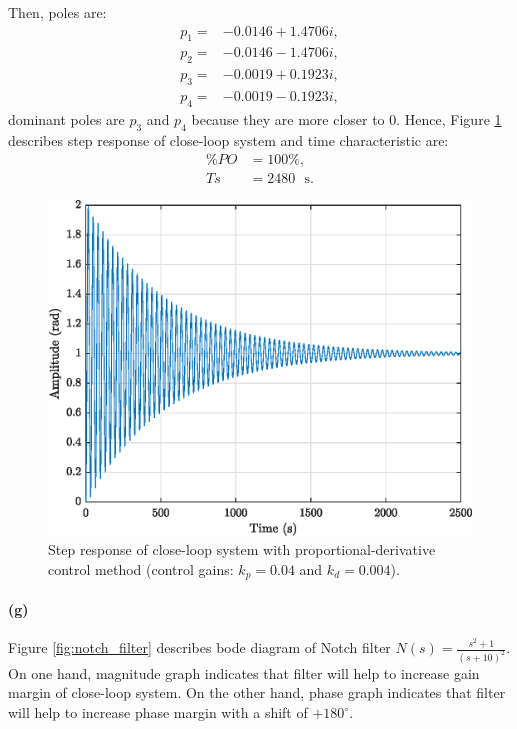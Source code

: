 Then, poles are:
\begin{align*}
	p_1=&-0.0146 + 1.4706i, \\
	p_2=&-0.0146 - 1.4706i, \\
	p_3=&-0.0019 + 0.1923i, \\
	p_4=&-0.0019 - 0.1923i ,
\end{align*}
\noindent dominant poles are $p_3$ and $p_4$ because they are more closer to $0$. Hence, Figure \ref{fig:q3_step_KD_CL} describes step response of close-loop system and time characteristic are:
\begin{align*}
	\%PO &= 100 \%, \\
	Ts &= 2480 \textrm{ } \mathrm{s}. 
\end{align*}

\begin{figure}[h!]
	\centering
	\includegraphics{images/question3/q3_step_KD_CL.eps}
	\caption{Step response of close-loop system with proportional-derivative control method (control gains: $k_p = 0.04$ and $k_d=0.004$).}
	\label{fig:q3_step_KD_CL}
\end{figure}

\newpage
\paragraph{(g)} Figure \ref{fig:notch_filter} describes bode diagram of Notch filter $N(s)=\frac{s^2 + 1}{(s+10)^2}$. On one hand, magnitude graph indicates that filter will help to increase gain margin of close-loop system. On the other hand, phase graph indicates that filter will help to increase phase margin with a shift of $+180^{\circ}$.

